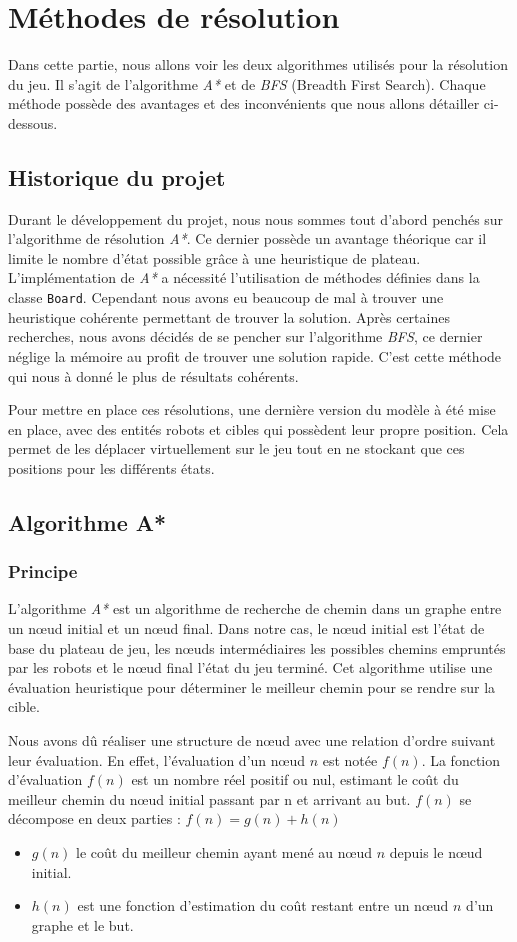 \documentclass[a4paper]{article} %
\begin{document}
\section{Méthodes de résolution}
	Dans cette partie, nous allons voir les deux algorithmes utilisés pour la résolution du jeu. Il s'agit de l'algorithme \textsl{A*} et de \textsl{BFS} (Breadth First Search). Chaque méthode possède des avantages et des inconvénients que nous allons détailler ci-dessous.
	
	\subsection{Historique du projet}
Durant le développement du projet, nous nous sommes tout d'abord penchés sur l'algorithme de résolution \textsl{A*}. Ce dernier possède un avantage théorique car il limite le nombre d'état possible grâce à une heuristique de plateau. L'implémentation de \textsl{A*} a nécessité l'utilisation de méthodes définies dans la classe \texttt{Board}. Cependant nous avons eu beaucoup de mal à trouver une heuristique cohérente permettant de trouver la solution. Après certaines recherches, nous avons décidés de se pencher sur l'algorithme \textsl{BFS}, ce dernier néglige la mémoire au profit de trouver une solution rapide. C'est cette méthode qui nous à donné le plus de résultats cohérents.

Pour mettre en place ces résolutions, une dernière version du modèle à été mise en place, avec des entités robots et cibles qui possèdent leur propre position. Cela permet de les déplacer virtuellement sur le jeu tout en ne stockant que ces positions pour les différents états.

	\subsection{Algorithme A*}
		\subsubsection{Principe}
L'algorithme \textsl{A*} est un algorithme de recherche de chemin dans un graphe entre un nœud initial et un nœud final. Dans notre cas, le nœud initial est l'état de base du plateau de jeu, les nœuds intermédiaires les possibles chemins empruntés par les robots et le nœud final l'état du jeu terminé.
Cet algorithme utilise une évaluation heuristique pour déterminer le meilleur chemin pour se rendre sur la cible.

Nous avons dû réaliser une structure de nœud avec une relation d'ordre suivant leur évaluation. En effet, l'évaluation d'un nœud $n$ est notée $f(n)$. La fonction d'évaluation $f(n)$ est un nombre réel positif ou nul, estimant le coût du meilleur chemin du nœud initial passant par n et arrivant au but. $f(n)$ se décompose en deux parties : $f(n) = g(n) + h(n)$
\begin{itemize}
\item $g(n)$ le coût du meilleur chemin ayant mené au nœud $n$ depuis le nœud initial.
\item $h(n)$ est une fonction d'estimation du coût restant entre un nœud $n$ d'un graphe et le but.
\end{itemize}
\end{document}
